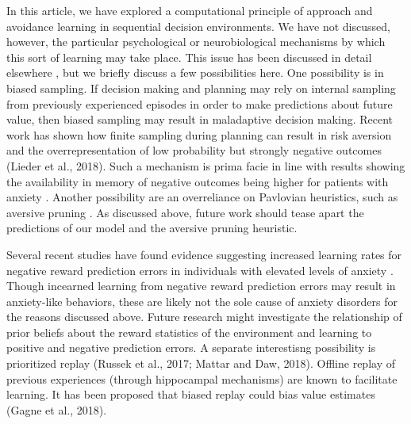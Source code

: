 \documentclass[11pt]{article} %
\begin{document}
In this article, we have explored a computational principle of approach and avoidance learning in sequential decision environments. We have not discussed, however, the particular psychological or neurobiological mechanisms by which this sort of learning may take place. This issue has been discussed in detail elsewhere \citep{Bishop2018}, but we briefly discuss a few possibilities here. One possibility is in biased sampling. If decision making and planning may rely on internal sampling from previously experienced episodes in order to make predictions about future value, then biased sampling may result in maladaptive decision making. Recent work has shown how finite sampling during planning can result in risk aversion and the overrepresentation of low probability but strongly negative outcomes (Lieder et al., 2018). Such a mechanism is prima facie in line with results showing the availability in memory of negative outcomes being higher for patients with anxiety \citep{Borkovec1999, Miranda2007}. Another possibility are an overreliance on Pavlovian heuristics, such as aversive pruning \citep{Huys2012,Lally2017}. As discussed above, future work should tease apart the predictions of our model and the aversive pruning heuristic.

Several recent studies have found evidence suggesting increased learning rates for negative reward prediction errors in individuals with elevated levels of anxiety \citep{Harle2017, Garrett2018, Aylward2019}. Though incearned learning from negative reward prediction errors may result in anxiety-like behaviors, these are likely not the sole cause of anxiety disorders for the reasons discussed above. Future research might investigate the relationship of prior beliefs about the reward statistics of the environment and learning to positive and negative prediction errors. A separate interestisng possibility is prioritized replay (Russek et al., 2017; Mattar and Daw, 2018). Offline replay of previous experiences (through hippocampal mechanisms) are known to facilitate learning. It has been proposed that biased replay could bias value estimates (Gagne et al., 2018).



\end{document}
